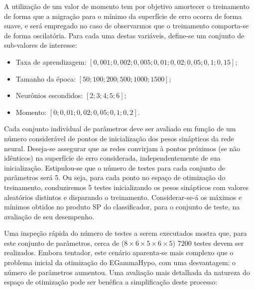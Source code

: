 A utilização de um valor de momento tem por objetivo amortecer o treinamento
de forma que a migração para o mínimo da superfície de erro ocorra de forma
suave, e será empregado no caso de observarmos que o treinamento comporta-se
de forma oscilatória. Para cada uma destas variáveis, define-se um conjunto de
sub-valores de interesse:

\begin{itemize}
\item Taxa de aprendizagem: $[0,001; 0,002; 0,005; 0,01; 0,02; 0,05; 0,1;
0,15]$;
\item Tamanho da época: $[50; 100; 200; 500; 1000; 1500]$;
\item Neurônios escondidos: $[2; 3; 4; 5; 6]$;
\item Momento: $[0; 0,01; 0,02; 0,05; 0,1; 0,2]$.
\end{itemize}

Cada conjunto individual de parâmetros deve ser avaliado em função de um
número considerável de pontos de inicialização dos pesos sinápticos da rede
neural. Deseja-se assegurar que as redes convirjam à pontos próximos (se não
idênticos) na superfície de erro considerada, independentemente de sua
inicialização. Estipulou-se que o número de testes para cada conjunto de
parâmetros será 5. Ou seja, para cada ponto no espaço de otimização do
treinamento, conduziremos 5 testes inicializando os pesos sinápticos com
valores aleatórios distintos e disparando o treinamento. Considerar-se-á os
máximos e mínimos obtidos no produto SP do classificador, para o conjunto de
teste, na avaliação de seu desempenho.

Uma inspeção rápida do número de testes a serem executados mostra que, para
este conjunto de parâmetros, cerca de ($8\times6\times5\times6\times5$) 
$7200$ testes devem ser realizados. Embora tentador, este cenário aparenta-se
mais complexo que o problema inicial da otimização do EGammaHypo, com uma
desvantagem: o número de parâmetros aumentou. Uma avaliação mais detalhada da
natureza do espaço de otimização pode ser benéfica a simplificação deste
processo: 

